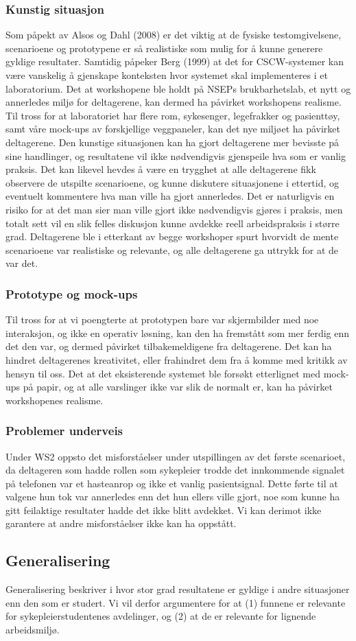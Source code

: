 \subsubsection{Kunstig situasjon}
Som påpekt av Alsos og Dahl (2008) er det viktig at de fysiske testomgivelsene, scenarioene og prototypene er så realistiske som mulig for å kunne generere gyldige resultater. Samtidig påpeker Berg (1999) at det for CSCW-systemer kan være vanskelig å gjenskape konteksten hvor systemet skal implementeres i et laboratorium. Det at workshopene ble holdt på NSEPs brukbarhetslab, et nytt og annerledes miljø for deltagerene, kan dermed ha påvirket workshopens realisme. Til tross for at laboratoriet har flere rom, sykesenger, legefrakker og pasienttøy, samt våre mock-ups av forskjellige veggpaneler, kan det nye miljøet ha påvirket deltagerene. Den kunstige situasjonen kan ha gjort deltagerene mer bevisste på sine handlinger, og resultatene vil ikke nødvendigvis gjenspeile hva som er vanlig praksis. Det kan likevel hevdes å være en trygghet at alle deltagerene fikk observere de utspilte scenarioene, og kunne diskutere situasjonene i ettertid, og eventuelt kommentere hva man ville ha gjort annerledes. Det er naturligvis en risiko for at det man sier man ville gjort ikke nødvendigvis gjøres i praksis, men totalt sett vil en slik felles diskusjon kunne avdekke reell arbeidspraksis i større grad. Deltagerene ble i etterkant av begge workshoper spurt hvorvidt de mente scenarioene var realistiske og relevante, og alle deltagerene ga uttrykk for at de var det.

\subsubsection{Prototype og mock-ups}
Til tross for at vi poengterte at prototypen bare var skjermbilder med noe interaksjon, og ikke en operativ løsning, kan den ha fremstått som mer ferdig enn det den var, og dermed påvirket tilbakemeldigene fra deltagerene. Det kan ha hindret deltagerenes kreativitet, eller frahindret dem fra å komme med kritikk av hensyn til oss. Det at det eksisterende systemet ble forsøkt etterlignet med mock-ups på papir, og at alle varslinger ikke var slik de normalt er, kan ha påvirket workshopenes realisme.

\subsubsection{Problemer underveis}
Under WS2 oppsto det misforståelser under utspillingen av det første scenarioet, da deltageren som hadde rollen som sykepleier trodde det innkommende signalet på telefonen var et hasteanrop og ikke et vanlig pasientsignal. Dette førte til at valgene hun tok var annerledes enn det hun ellers ville gjort, noe som kunne ha gitt feilaktige resultater hadde det ikke blitt avdekket. Vi kan derimot ikke garantere at andre misforståelser ikke kan ha oppstått.

\subsection{Generalisering}
Generalisering beskriver i hvor stor grad resultatene er gyldige i andre situasjoner enn den som er studert. Vi vil derfor argumentere for at (1) funnene er relevante for sykepleierstudentenes avdelinger, og (2) at de er relevante for lignende arbeidsmiljø. 

